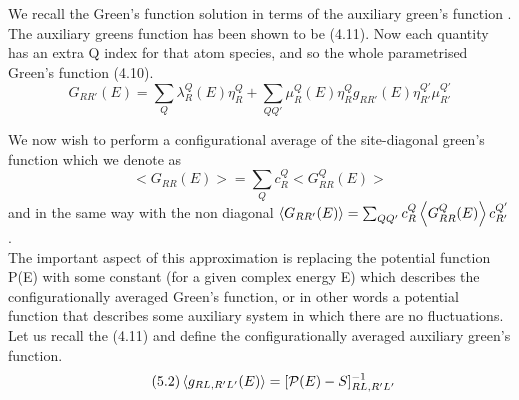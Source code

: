 \documentclass[12pt]{article}
\begin{document}
We recall the Green's function solution in terms of the auxiliary green's function \cite{andersen}.
The auxiliary greens function has been shown to be (4.11).
Now each quantity has an extra Q index for that atom species, and so the whole parametrised Green's function (4.10).
\begin{equation} \label{4.1} \tag{5.1}
G_{RR'}(E)= \sum_Q \lambda_R^Q(E)\eta_R^Q +\sum_{QQ'} \mu_R^Q(E) \eta_R^Q g_{RR'}(E) \eta_{R'}^{Q'} \mu_{R'}^{Q'}
\end{equation}

We now wish to perform a configurational average of the site-diagonal green's function which we denote as $$<G_{RR}(E)>= \sum_Q c_R^Q <G_{RR}^Q(E)>$$ and in the same way with the non diagonal $\expval{G_{RR'}(E)}= \sum_{QQ'} c_R^Q \expval{G_{RR}^Q(E)} c_{R'}^{Q'}$.
\\ 
The important aspect of this approximation is replacing the potential function P(E) with some constant (for a given complex energy E) which describes the configurationally averaged Green's function, or in other words a potential function that describes some auxiliary system in which there are no fluctuations. Let us recall the (4.11) and define the configurationally averaged auxiliary green's function.
\begin{equation} \label{4.1} \tag{5.2}
\expval{g_{RL,R'L'}(E)}=[\mathcal{P}(E)-S]^{-1}_{RL,R'L'}
\end{equation}
\end{document}
